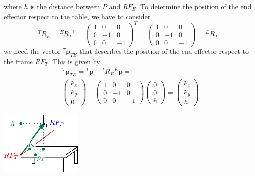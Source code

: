 \documentclass[10pt, letterpaper]{report}
\begin{document}
where $h$ is the distance between $P$ and $RF_E$. To determine the position of the end effector respect to the table, we have to consider\begin{equation}
    {}^TR_E={}^ER_T^{-1}=\begin{pmatrix}
        1&0&0\\ 
        0&-1&0\\ 
        0&0&-1
    \end{pmatrix}^T=\begin{pmatrix}
        1&0&0\\ 
        0&-1&0\\ 
        0&0&-1
    \end{pmatrix}={}^ER_T
\end{equation}
we need the vector ${}^T\mathbf p_{TE}$ that describes the position of the end effector respect to the frame $RF_T$. This is given by \begin{align}
    &{}^T\mathbf p_{TE}={}^T\mathbf p-{}^TR_E{}^E\mathbf p=\\ 
    &\begin{pmatrix}
        p_x\\p_y\\ 0
    \end{pmatrix}-\begin{pmatrix}
        1&0&0\\ 
        0&-1&0\\ 
        0&0&-1
    \end{pmatrix}\begin{pmatrix}
       0\\0\\ h
    \end{pmatrix}=\begin{pmatrix}
        p_x\\p_y\\ h
    \end{pmatrix}
\end{align}\begin{center}
    \includegraphics[width=0.3\textwidth ]{images/rob_task2.eps}
\end{center}
\end{document}
